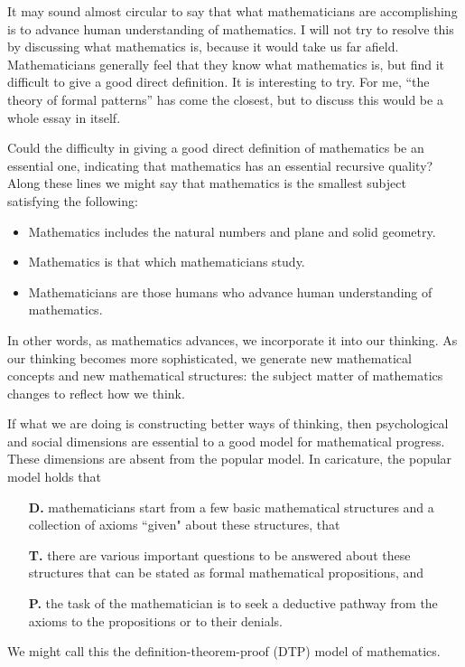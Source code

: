 \documentclass[12pt]{amsart}
\begin{document}
\bigskip

It may sound almost circular to say that what
mathematicians are accomplishing is
to advance human understanding of mathematics.
I will not try to resolve this by discussing what 
mathematics is,
because it would take us far afield. Mathematicians 
generally feel that
they know what mathematics is, but find it difficult to 
give a good direct
definition. It is interesting to try. For me, ``the theory 
of formal
patterns'' has come the closest, but to discuss this would 
be a whole essay in
itself.

Could the difficulty in giving a good direct definition of 
mathematics
be an essential one, indicating that mathematics has an 
essential
recursive quality? Along these lines we might say that 
mathematics
is the smallest subject satisfying the following:
\begin{itemize}
\item Mathematics includes the natural numbers and plane 
and solid geometry.
\item Mathematics is that which mathematicians study.
\item Mathematicians are those humans who advance human 
understanding of
mathematics.
\end{itemize}
In other words, as mathematics advances, we incorporate it 
into our thinking.
As our thinking becomes more sophisticated, we generate 
new mathematical
concepts and new mathematical structures: the subject 
matter of
mathematics changes to reflect how we think.

\medskip
If what we are doing is constructing better ways of 
thinking, then
psychological and social dimensions are essential to a 
good model
for mathematical progress.  These dimensions are absent 
from the popular
model.  In caricature, the popular model
holds that
\begin{itemize}
\item[\bf D.]
 mathematicians start from a few basic mathematical 
structures
and a collection of axioms ``given" about these 
structures, that 
\item[\bf T.]
there are various important questions 
to be answered about these structures that can be stated 
as formal mathematical
propositions, and
\item[\bf P.]
the task of the 
mathematician is to seek a deductive pathway from the 
axioms to 
the propositions or to their denials.
\end{itemize}
 We might call this the
definition-theorem-proof (DTP) model of mathematics.
\end{document}
